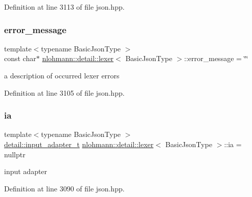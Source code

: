 Definition at line 3113 of file json.\+hpp.

\mbox{\label{classnlohmann_1_1detail_1_1lexer_ae2a15e440f1889e0ab0c6a35344e48df}} 
\subsubsection{\texorpdfstring{error\+\_\+message}{error\_message}}
{\footnotesize\ttfamily template$<$typename Basic\+Json\+Type $>$ \\
const char$\ast$ \hyperlink{classnlohmann_1_1detail_1_1lexer}{nlohmann\+::detail\+::lexer}$<$ Basic\+Json\+Type $>$\+::error\+\_\+message = \char`\"{}\char`\"{}\hspace{0.3cm}{\ttfamily [private]}}



a description of occurred lexer errors 



Definition at line 3105 of file json.\+hpp.

\mbox{\label{classnlohmann_1_1detail_1_1lexer_aa7e69cd9d51451fd798eaf501b40421f}} 
\subsubsection{\texorpdfstring{ia}{ia}}
{\footnotesize\ttfamily template$<$typename Basic\+Json\+Type $>$ \\
\hyperlink{namespacenlohmann_1_1detail_ae132f8cd5bb24c5e9b40ad0eafedf1c2}{detail\+::input\+\_\+adapter\+\_\+t} \hyperlink{classnlohmann_1_1detail_1_1lexer}{nlohmann\+::detail\+::lexer}$<$ Basic\+Json\+Type $>$\+::ia = nullptr\hspace{0.3cm}{\ttfamily [private]}}



input adapter 



Definition at line 3090 of file json.\+hpp.

\mbox{\label{classnlohmann_1_1detail_1_1lexer_aaa7a7bba826023ee34e9c99d51d55468}} 
